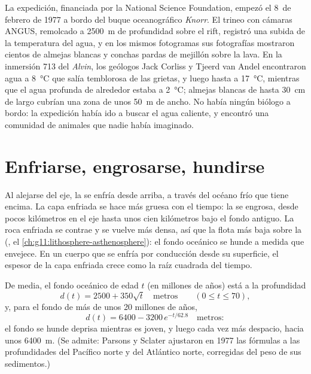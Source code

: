 \begin{history}
La expedición, financiada por la National Science Foundation, empezó el
8~de febrero de 1977 a bordo del buque oceanográfico \emph{Knorr}. El trineo
con cámaras ANGUS, remolcado a \qty{2500}{m} de profundidad sobre el rift,
registró una subida de la temperatura del agua, y en los mismos fotogramas
sus fotografías mostraron cientos de almejas blancas y conchas pardas de
mejillón sobre la lava. En la inmersión 713 del \emph{Alvin}, los geólogos
Jack Corliss y Tjeerd van Andel encontraron agua a \qty{8}{\celsius} que
salía temblorosa de las grietas, y luego hasta a \qty{17}{\celsius}, mientras
que el agua profunda de alrededor estaba a \qty{2}{\celsius}; almejas blancas
de hasta \qty{30}{cm} de largo cubrían una zona de unos \qty{50}{m} de ancho.
No había ningún biólogo a bordo: la expedición había ido a buscar el agua
caliente, y encontró una comunidad de animales que nadie había imaginado.
\end{history}

\section{Enfriarse, engrosarse, hundirse}

Al alejarse del eje, la  se enfría desde arriba, a través del océano
frío que tiene encima. La capa enfriada se hace más gruesa con el tiempo: la
 se engrosa, desde pocos kilómetros en el eje hasta unos cien
kilómetros bajo el fondo antiguo. La roca enfriada se contrae y se vuelve más
densa, así que la  flota más baja sobre la  (, el
\cref{ch:g11:lithosphere-asthenosphere}): el fondo oceánico se hunde a medida
que envejece. En un cuerpo que se enfría por conducción desde su superficie,
el espesor de la capa enfriada crece como la raíz cuadrada del tiempo.

\begin{proposition}\label{prop:g11:ocean-ridges:depth-age}
De media, el fondo oceánico de edad $t$ (en millones de años) está a la
profundidad
\[
  d(t) = 2500 + 350\sqrt{t} \quad \text{metros} \qquad (0 \le t \le 70),
\]
y, para el fondo de más de unos 20 millones de años,
\[
  d(t) = 6400 - 3200\,e^{-t/62.8} \quad \text{metros}:
\]
el fondo se hunde deprisa mientras es joven, y luego cada vez más despacio,
hacia unos \qty{6400}{m}. (Se admite: Parsons y Sclater ajustaron en 1977 las
fórmulas a las profundidades del Pacífico norte y del Atlántico norte,
corregidas del peso de sus sedimentos.)
\end{proposition}

